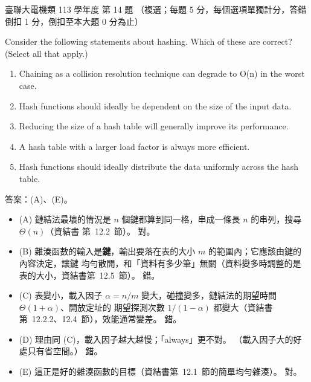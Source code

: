 \begin{pastexam}[label={px:ust-113-ee-ds-14}]{臺聯大電機類 113 學年度 第 14 題}
（複選；每題 5 分，每個選項單獨計分，答錯倒扣 1 分，倒扣至本大題 0 分為止）

Consider the following statements about hashing. Which of these are correct? (Select all that
apply.)
\begin{enumerate}[label=(\Alph*)]
\item Chaining as a collision resolution technique can degrade to O(n) in the worst case.
\item Hash functions should ideally be dependent on the size of the input data.
\item Reducing the size of a hash table will generally improve its performance.
\item A hash table with a larger load factor is always more efficient.
\item Hash functions should ideally distribute the data uniformly across the hash table.
\end{enumerate}
\end{pastexam}

\begin{pastsoln}
答案：(A)、(E)。

\begin{itemize}
\item (A) 鏈結法最壞的情況是 $n$ 個鍵都算到同一格，串成一條長 $n$ 的串列，搜尋 $\Theta(n)$（資結書
第~12.2~節）。 對。
\item (B) 雜湊函數的輸入是\textbf{鍵}，輸出要落在表的大小 $m$ 的範圍內；它應該由鍵的內容決定，讓鍵
均勻散開，和「資料有多少筆」無關（資料變多時調整的是表的大小，資結書第~12.5~節）。 錯。
\item (C) 表變小，載入因子 $\alpha = n/m$ 變大，碰撞變多，鏈結法的期望時間 $\Theta(1 + \alpha)$、開放定址的
期望探測次數 $1/(1 - \alpha)$ 都變大（資結書第~12.2.2、12.4~節），效能通常變差。 錯。
\item (D) 理由同 (C)，載入因子越大越慢；「always」更不對。 （載入因子大的好處只有省空間。） 錯。
\item (E) 這正是好的雜湊函數的目標（資結書第~12.1~節的簡單均勻雜湊）。 對。
\end{itemize}
\end{pastsoln}
